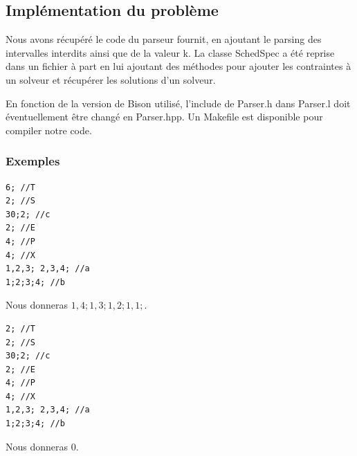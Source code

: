 \documentclass[a4paper,10pt]{article}
\begin{document}

\subsection{Implémentation du problème}
Nous avons récupéré le code du parseur fournit, en ajoutant le parsing des intervalles interdits ainsi
que de la valeur k. La classe SchedSpec a été reprise dans un fichier à part en lui ajoutant des méthodes
pour ajouter les contraintes à un solveur et récupérer les solutions d'un solveur.

En fonction de la version de Bison utilisé, l'include de Parser.h dans Parser.l doit éventuellement être changé en Parser.hpp.
Un Makefile est disponible pour compiler notre code.


\subsubsection{Exemples}
\begin{lstlisting}[frame=single]
6; //T
2; //S
30;2; //c
2; //E
4; //P
4; //X
1,2,3; 2,3,4; //a
1;2;3;4; //b
\end{lstlisting}
Nous donneras $1,4;1,3;1,2;1,1;$.
\begin{lstlisting}[frame=single]
2; //T
2; //S
30;2; //c
2; //E
4; //P
4; //X
1,2,3; 2,3,4; //a
1;2;3;4; //b
\end{lstlisting}
Nous donneras $0$.
\end{document}
